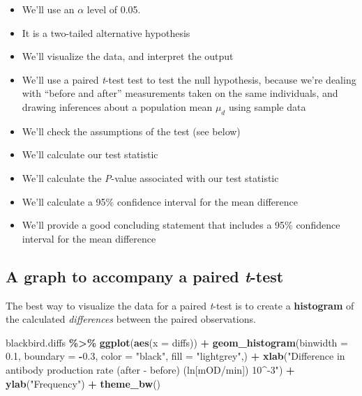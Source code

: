 \documentclass[
]{book}
\newenvironment{Shaded}{\begin{snugshade}}{\end{snugshade}}
\newcommand{\AttributeTok}[1]{\textcolor[rgb]{0.13,0.29,0.53}{#1}}
\newcommand{\FloatTok}[1]{\textcolor[rgb]{0.00,0.00,0.81}{#1}}
\newcommand{\FunctionTok}[1]{\textcolor[rgb]{0.13,0.29,0.53}{\textbf{#1}}}
\newcommand{\NormalTok}[1]{#1}
\newcommand{\SpecialCharTok}[1]{\textcolor[rgb]{0.81,0.36,0.00}{\textbf{#1}}}
\newcommand{\StringTok}[1]{\textcolor[rgb]{0.31,0.60,0.02}{#1}}
\providecommand{\tightlist}{%
  \setlength{\itemsep}{0pt}\setlength{\parskip}{0pt}}
\begin{document}
\begin{itemize}
\tightlist
\item
  We'll use an \(\alpha\) level of 0.05.\\
\item
  It is a two-tailed alternative hypothesis
\item
  We'll visualize the data, and interpret the output
\item
  We'll use a paired \emph{t}-test test to test the null hypothesis, because we're dealing with ``before and after'' measurements taken on the same individuals, and drawing inferences about a population mean \(\mu_d\) using sample data\\
\item
  We'll check the assumptions of the test (see below)
\item
  We'll calculate our test statistic
\item
  We'll calculate the \emph{P}-value associated with our test statistic
\item
  We'll calculate a 95\% confidence interval for the mean difference
\item
  We'll provide a good concluding statement that includes a 95\% confidence interval for the mean difference
\end{itemize}

\subsection{\texorpdfstring{A graph to accompany a paired \emph{t}-test}{A graph to accompany a paired t-test}}\label{graph_paried}

The best way to visualize the data for a paired \emph{t}-test is to create a \textbf{histogram} of the calculated \emph{differences} between the paired observations.

\begin{Shaded}
\begin{Highlighting}[]
\NormalTok{blackbird.diffs }\SpecialCharTok{\%\textgreater{}\%} 
  \FunctionTok{ggplot}\NormalTok{(}\FunctionTok{aes}\NormalTok{(}\AttributeTok{x =}\NormalTok{ diffs)) }\SpecialCharTok{+}
  \FunctionTok{geom\_histogram}\NormalTok{(}\AttributeTok{binwidth =} \FloatTok{0.1}\NormalTok{, }\AttributeTok{boundary =} \SpecialCharTok{{-}}\FloatTok{0.3}\NormalTok{, }
                 \AttributeTok{color =} \StringTok{"black"}\NormalTok{, }\AttributeTok{fill =} \StringTok{"lightgrey"}\NormalTok{,) }\SpecialCharTok{+}
  \FunctionTok{xlab}\NormalTok{(}\StringTok{"Difference in antibody production rate (after {-} before) (ln[mOD/min]) 10\^{}{-}3"}\NormalTok{) }\SpecialCharTok{+}
  \FunctionTok{ylab}\NormalTok{(}\StringTok{"Frequency"}\NormalTok{) }\SpecialCharTok{+}
  \FunctionTok{theme\_bw}\NormalTok{()}
\end{Highlighting}
\end{Shaded}
\end{document}

